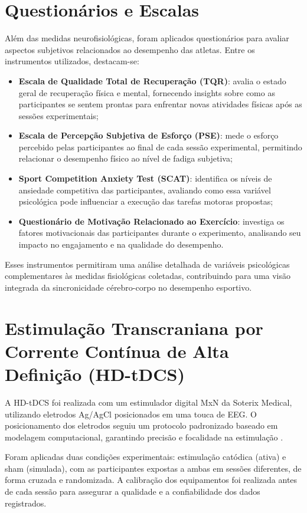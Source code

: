 \section{Questionários e Escalas}
Além das medidas neurofisiológicas, foram aplicados questionários para avaliar aspectos subjetivos relacionados ao desempenho das atletas. Entre os instrumentos utilizados, destacam-se:
\begin{itemize}
    \item \textbf{Escala de Qualidade Total de Recuperação (TQR)}: avalia o estado geral de recuperação física e mental, fornecendo insights sobre como as participantes se sentem prontas para enfrentar novas atividades físicas após as sessões experimentais;
    \item \textbf{Escala de Percepção Subjetiva de Esforço (PSE)}: mede o esforço percebido pelas participantes ao final de cada sessão experimental, permitindo relacionar o desempenho físico ao nível de fadiga subjetiva;
    \item \textbf{Sport Competition Anxiety Test (SCAT)}: identifica os níveis de ansiedade competitiva das participantes, avaliando como essa variável psicológica pode influenciar a execução das tarefas motoras propostas;
    \item \textbf{Questionário de Motivação Relacionado ao Exercício}: investiga os fatores motivacionais das participantes durante o experimento, analisando seu impacto no engajamento e na qualidade do desempenho.
\end{itemize}
Esses instrumentos permitiram uma análise detalhada de variáveis psicológicas complementares às medidas fisiológicas coletadas, contribuindo para uma visão integrada da sincronicidade cérebro-corpo no desempenho esportivo.


\section{Estimulação Transcraniana por Corrente Contínua de Alta Definição (HD-tDCS)}

A HD-tDCS foi realizada com um estimulador digital MxN da Soterix Medical, utilizando eletrodos Ag/AgCl posicionados em uma touca de EEG. O posicionamento dos eletrodos seguiu um protocolo padronizado baseado em modelagem computacional, garantindo precisão e focalidade na estimulação \cite{datta2008transcranial}. 

Foram aplicadas duas condições experimentais: estimulação catódica (ativa) e sham (simulada), com as participantes expostas a ambas em sessões diferentes, de forma cruzada e randomizada. A calibração dos equipamentos foi realizada antes de cada sessão para assegurar a qualidade e a confiabilidade dos dados registrados.

